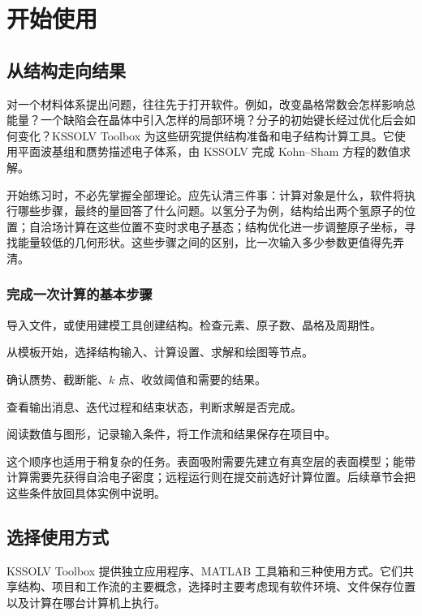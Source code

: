 \chapter{开始使用 }\label{ch:introduction}

\section{从结构走向结果}
对一个材料体系提出问题，往往先于打开软件。例如，改变晶格常数会怎样影响总能量？一个缺陷会在晶体中引入怎样的局部环境？分子的初始键长经过优化后会如何变化？KSSOLV Toolbox 为这些研究提供结构准备和电子结构计算工具。它使用平面波基组和赝势描述电子体系，由 KSSOLV 完成 Kohn--Sham 方程的数值求解。

开始练习时，不必先掌握全部理论。应先认清三件事：计算对象是什么，软件将执行哪些步骤，最终的量回答了什么问题。以氢分子为例，结构给出两个氢原子的位置；自洽场计算在这些位置不变时求电子基态；结构优化进一步调整原子坐标，寻找能量较低的几何形状。这些步骤之间的区别，比一次输入多少参数更值得先弄清。

\subsection{完成一次计算的基本步骤}
\begin{steps}
\item {}导入文件，或使用建模工具创建结构。检查元素、原子数、晶格及周期性。
\item {}从模板开始，选择结构输入、计算设置、求解和绘图等节点。
\item {}确认赝势、截断能、$k$ 点、收敛阈值和需要的结果。
\item {}查看输出消息、迭代过程和结束状态，判断求解是否完成。
\item {}阅读数值与图形，记录输入条件，将工作流和结果保存在项目中。
\end{steps}

这个顺序也适用于稍复杂的任务。表面吸附需要先建立有真空层的表面模型；能带计算需要先获得自洽电子密度；远程运行则在提交前选好计算位置。后续章节会把这些条件放回具体实例中说明。

\section{选择使用方式}
KSSOLV Toolbox 提供独立应用程序、MATLAB\regmark{} 工具箱和\ksonline{}三种使用方式。它们共享结构、项目和工作流的主要概念，选择时主要考虑现有软件环境、文件保存位置以及计算在哪台计算机上执行。

